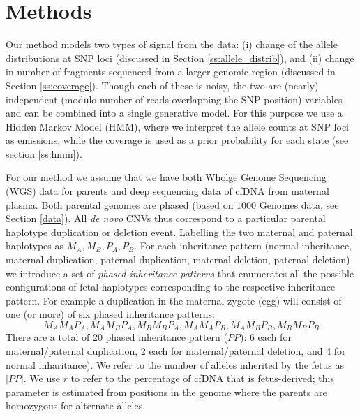 \section{Methods}
Our method models two types of signal from the data: (i) change of the allele distributions at SNP loci (discussed in Section \ref{ss:allele_distrib}), and (ii) change in number of fragments sequenced from a larger genomic region (discussed in Section \ref{ss:coverage}). Though each of these is noisy, the two are (nearly) independent (modulo number of reads overlapping the SNP position) variables and can be combined into a single generative model. For this purpose we use a Hidden Markov Model (HMM), where we interpret the allele counts at SNP loci as emissions, while the coverage is used as a prior probability for each state (see section \ref{ss:hmm}). 

For our method we assume that we have both Wholge Genome Sequencing (WGS) data for parents and deep sequencing data of cfDNA from maternal plasma. Both parental genomes are phased (based on 1000 Genomes data, see Section \ref{data}). All \textit{de novo} CNVs thus correspond to a particular parental haplotype duplication or deletion event. Labelling the two maternal and paternal haplotypes as $M_A,M_B,P_A,P_B$. For each inheritance pattern (normal inheritance, maternal duplication, paternal duplication, maternal deletion, paternal deletion) we introduce a set of \textit{phased inheritance patterns} that enumerates all the possible configurations of fetal haplotypes corresponding to the respective inheritance pattern. For example a duplication in the maternal zygote (egg) will consist of one (or more) 
of  six phased inheritance patterns: 
$$M_AM_AP_A, M_AM_BP_A, M_BM_BP_A, M_AM_AP_B, M_AM_BP_B, M_BM_BP_B$$
There are a total of 20 phased inheritance pattern ($PP$): 6 each for maternal/paternal duplication, 2 each for maternal/paternal deletion, and 4 for normal inharitance). We refer to the number of alleles inherited by the fetus as $|PP|$. We use $r$ to refer to the percentage of cfDNA that is fetus-derived; this parameter is estimated from positions in the genome where the parents are homozygous for alternate alleles.



